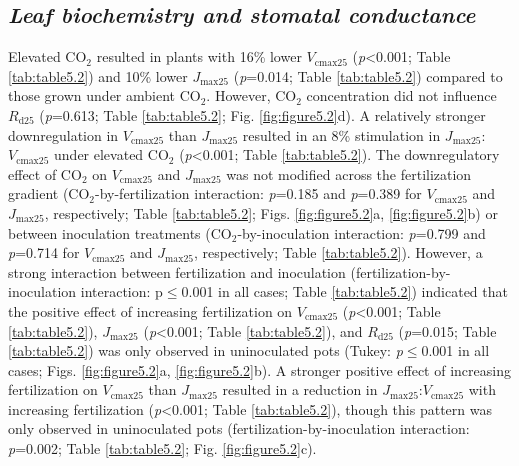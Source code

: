 \subsection{\textit{Leaf biochemistry and stomatal conductance}}
\noindent Elevated CO$_2$ resulted in plants with 16\% lower $V_\mathrm{cmax25}$ (\textit{p}<0.001; Table \ref{tab:table5.2}) and 10\% lower $J_\mathrm{max25}$ (\textit{p}=0.014; Table \ref{tab:table5.2}) compared to those grown under ambient CO$_2$. However, CO$_2$ concentration did not influence $R_\mathrm{d25}$ (\textit{p}=0.613; Table \ref{tab:table5.2}; Fig. \ref{fig:figure5.2}d). A relatively stronger downregulation in $V_\mathrm{cmax25}$ than $J_\mathrm{max25}$ resulted in an 8\% stimulation in $J_\mathrm{max25}$:$V_\mathrm{cmax25}$ under elevated CO$_2$ (\textit{p}<0.001; Table \ref{tab:table5.2}). The downregulatory effect of CO$_2$ on $V_\mathrm{cmax25}$ and $J_\mathrm{max25}$ was not modified across the fertilization gradient (CO$_2$-by-fertilization interaction: \textit{p}=0.185 and \textit{p}=0.389 for $V_\mathrm{cmax25}$ and $J_\mathrm{max25}$, respectively; Table \ref{tab:table5.2}; Figs. \ref{fig:figure5.2}a, \ref{fig:figure5.2}b) or between inoculation treatments (CO$_2$-by-inoculation interaction: \textit{p}=0.799 and \textit{p}=0.714 for $V_\mathrm{cmax25}$ and $J_\mathrm{max25}$, respectively; Table \ref{tab:table5.2}). However, a strong interaction between fertilization and inoculation (fertilization-by-inoculation interaction: p$\le$0.001 in all cases; Table \ref{tab:table5.2}) indicated that the  positive effect of increasing fertilization on $V_\mathrm{cmax25}$ (\textit{p}<0.001; Table \ref{tab:table5.2}), $J_\mathrm{max25}$ (\textit{p}<0.001; Table \ref{tab:table5.2}), and $R_\mathrm{d25}$ (\textit{p}=0.015; Table \ref{tab:table5.2}) was only observed in uninoculated pots (Tukey: \textit{p}$\le$0.001 in all cases; Figs. \ref{fig:figure5.2}a, \ref{fig:figure5.2}b). A stronger positive effect of increasing fertilization on $V_\mathrm{cmax25}$ than $J_\mathrm{max25}$ resulted in a reduction in $J_\mathrm{max25}$:$V_\mathrm{cmax25}$ with increasing fertilization (\textit{p}<0.001; Table \ref{tab:table5.2}), though this pattern was only observed in uninoculated pots (fertilization-by-inoculation interaction: \textit{p}=0.002; Table \ref{tab:table5.2}; Fig. \ref{fig:figure5.2}c).

